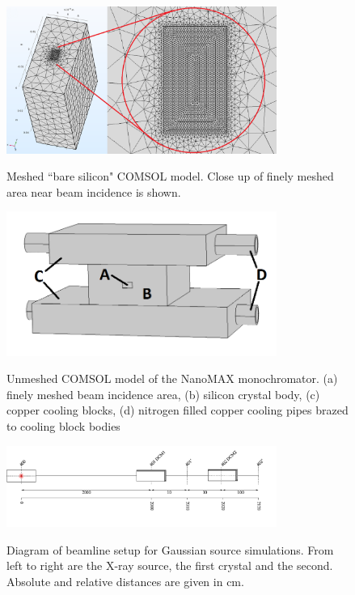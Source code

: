 \documentclass[preprint]{iucr}              %
\begin{document}
\begin{figure}
\caption{Meshed ``bare silicon" COMSOL model. Close up of finely meshed area near beam incidence is shown.}
\includegraphics[width = 8.85cm]{images/bare_silicon.png}
\label{fig:bare_silicon}
\end{figure}

\begin{figure}
\caption{Unmeshed COMSOL model of the NanoMAX monochromator. (a) finely meshed beam incidence area, (b) silicon crystal body, (c) copper cooling blocks, (d) nitrogen filled copper cooling pipes brazed to cooling block bodies}
\includegraphics[width = 8.85cm]{images/nanomaxcomsol.png}
\label{fig:nanomaxcomsol}
\end{figure}


\begin{figure}
\caption{Diagram of beamline setup for Gaussian source simulations. From left to right are the X-ray source, the first crystal and the second. Absolute and relative distances are given in cm.}
\includegraphics[width = 8.85cm]{images/gaussian_beamline.png}
\label{fig:dcmtracing}
\end{figure}
\end{document}
